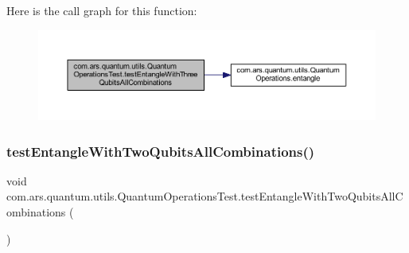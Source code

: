 Here is the call graph for this function\+:\nopagebreak
\begin{figure}[H]
\begin{center}
\leavevmode
\includegraphics[width=350pt]{classcom_1_1ars_1_1quantum_1_1utils_1_1_quantum_operations_test_a71ffaf6b899b2a1586f7da357e0517ba_cgraph}
\end{center}
\end{figure}
\hypertarget{classcom_1_1ars_1_1quantum_1_1utils_1_1_quantum_operations_test_afc5716dca716e29a0cdbcfe069a815a3}{}\label{classcom_1_1ars_1_1quantum_1_1utils_1_1_quantum_operations_test_afc5716dca716e29a0cdbcfe069a815a3} 
\subsubsection{\texorpdfstring{test\+Entangle\+With\+Two\+Qubits\+All\+Combinations()}{testEntangleWithTwoQubitsAllCombinations()}}
{\footnotesize\ttfamily void com.\+ars.\+quantum.\+utils.\+Quantum\+Operations\+Test.\+test\+Entangle\+With\+Two\+Qubits\+All\+Combinations (\begin{DoxyParamCaption}{ }\end{DoxyParamCaption})}


